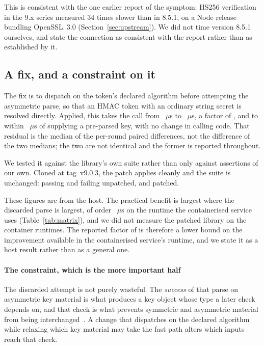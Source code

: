 \documentclass[preprint,12pt,authoryear]{elsarticle}
\newcommand{\LibraryTag}{tag~v9.0.3}
\begin{document}
This is consistent with the one earlier report of the symptom: HS256
verification in the 9.x series measured 34 times slower than in 8.5.1, on a
Node release bundling OpenSSL~3.0 (Section~\ref{sec:upstream}). We did not
time version 8.5.1 ourselves, and state the connection as consistent with the
report rather than as established by it.

\subsection{A fix, and a constraint on it}\label{sec:fix}

The fix is to dispatch on the token's declared algorithm before attempting the
asymmetric parse, so that an HMAC token with an ordinary string secret is
resolved directly. Applied, this takes the call from \HostJwtString~$\mu$s to
\HostJwtStringSafe~$\mu$s, a factor of \HostSafePatchRatio, and to within
\HostSafePatchResidual~$\mu$s of supplying a pre-parsed key, with no change in
calling code. That residual is the median of the per-round paired differences,
not the difference of the two medians; the two are not identical and the former
is reported throughout.

We tested it against the library's own suite rather than only against assertions
of our own. Cloned at \LibraryTag, the patch applies cleanly and the suite is
unchanged: \SuiteStockPassing{} passing and \SuiteStockFailing{} failing
unpatched, \SuitePatchedPassing{} and \SuitePatchedFailing{} patched.

These figures are from the host. The practical benefit is largest where the
discarded parse is largest, of order \NodeEighteenProbeThrows~$\mu$s on the
runtime the containerised service uses (Table~\ref{tab:matrix}), and we did not
measure the patched library on the container runtimes. The reported factor of
\HostSafePatchRatio{} is therefore a lower bound on the improvement available in
the containerised service's runtime, and we state it as a host result rather than as a
general one.

\paragraph{The constraint, which is the more important half} The discarded
attempt is not purely wasteful. The \emph{success} of that parse on asymmetric
key material is what produces a key object whose type a later check depends on,
and that check is what prevents symmetric and asymmetric material from being
interchanged~\citep{rfc8725}. A change that dispatches on the declared algorithm
while relaxing which key material may take the fast path alters which inputs
reach that check.
\end{document}
